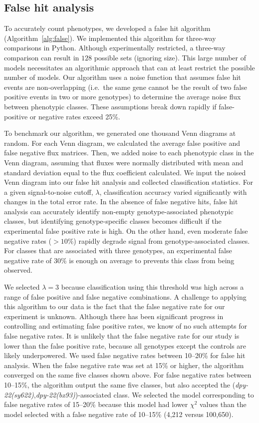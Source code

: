 \documentclass[8pt, twocolumn]{article}
\newcommand{\gene}[1]{\mbox{\emph{#1}}}
\newcommand{\dpy}[1]{\gene{dpy-22#1}}
\newcommand{\bx}{\dpy{(bx93)}}
\newcommand{\sy}{\dpy{(sy622)}}
\begin{document}
\subsection*{False hit analysis}
To accurately count phenotypes, we developed a false hit algorithm
(Algorithm~\ref{alg:false}). We implemented this algorithm for three-way
comparisons in Python. Although experimentally restricted, a three-way
comparison can result in $128$ possible sets (ignoring size). This large number
of models necessitates an algorithmic approach that can at least restrict the
possible number of models. Our algorithm uses a noise function that assumes
false hit events are non-overlapping (i.e.\ the same gene cannot be the result
of two false positive events in two or more genotypes) to determine the average
noise flux between phenotypic classes. These assumptions break down rapidly if
false-positive or negative rates exceed 25\%.

To benchmark our algorithm, we generated one thousand Venn diagrams at random.
For each Venn diagram, we calculated the average false positive and false
negative flux matrices. Then, we added noise to each phenotypic class in the
Venn diagram, assuming that fluxes were normally distributed with mean and
standard deviation equal to the flux coefficient calculated. We input the noised
Venn diagram into our false hit analysis and collected classification
statistics. For a given signal-to-noise cutoff, $\lambda$, classification
accuracy varied significantly with changes in the total error rate. In the
absence of false negative hits, false hit analysis can accurately identify
non-empty genotype-associated phenotypic classes, but identifying
genotype-specific classes becomes difficult if the experimental false positive
rate is high. On the other hand, even moderate false negative rates ($>10\%$)
rapidly degrade signal from genotype-associated classes. For classes that are
associated with three genotypes, an experimental false negative rate of 30\% is
enough on average to prevents this class from being observed.

We selected $\lambda=3$ because classification using this threshold was high
across a range of false positive and false negative combinations. A challenge to
applying this algorithm to our data is the fact that the false negative rate for
our experiment is unknown. Although there has been significant progress in
controlling and estimating false positive rates, we know of no such attempts for
false negative rates. It is unlikely that the false negative rate for our study
is lower than the false positive rate, because all genotypes except the controls
are likely underpowered. We used false negative rates between 10--20\% for false
hit analysis. When the false negative rate was set at 15\% or higher, the
algorithm converged on the same five classes shown above. For false negative
rates between 10--15\%, the algorithm output the same five classes, but also
accepted the (\sy{},\bx{})-associated class. We selected the model corresponding
to false negative rates of 15--20\% because this model had lower $\chi^2$ values
than the model selected with a false negative rate of 10--15\% (4,212 versus
100,650).
\end{document}
